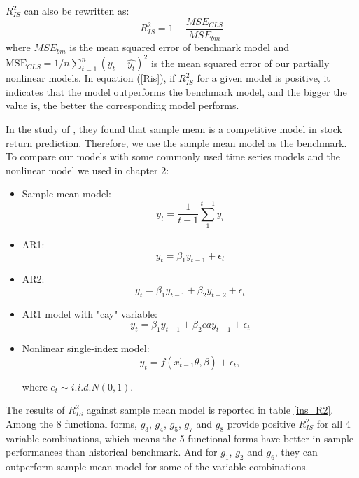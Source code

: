 \documentclass[a4paper,12pt,times,numbered,print,index]{report}
\numberwithin{equation}{section}
\begin{document}

$R^2_{IS}$ can also be rewritten as:
\begin{equation}
	R_{IS}^{2}=1-\frac{MSE_{CLS}}{MSE_{bm}}
	\label{Ris}
\end{equation}
where $MSE_{bm}$ is the mean squared error of benchmark model and $\mathrm{MSE}_{CLS}=1 / n \sum_{t=1}^{n}\left(y_{t}-\hat{y_t}\right)^{2}$ is the mean squared error of our partially nonlinear models.
In equation (\ref{Ris}), if $R^2_{IS}$ for a given model is positive, it indicates that the model outperforms the benchmark model, and the bigger the value is, the better the corresponding model performs.

In the study of \cite{welch2008comprehensive}, they found that sample mean is a competitive model in stock return prediction. Therefore, we use the sample mean model as the benchmark. To compare our models with some commonly used time series models and the nonlinear model we used in chapter 2:

\begin{itemize}
	\item Sample mean model: 
	$$
	y_t= \dfrac{1}{t-1}\sum_{1}^{t-1}y_i
	$$
	\item AR1:
	$$
	y_t = \beta_{1}y_{t-1} + \epsilon_t
	$$
	\item AR2:
	$$
	y_t =\beta_{1} y_{t-1} + \beta_{2} y_{t-2} + \epsilon_t
	$$
	\item AR1 model with "cay" variable:
	$$
	y_t = \beta_{1}y_{t-1} + \beta_{2}cay_{t-1} + \epsilon_t
	$$
	\item Nonlinear single-index model:
	$$
	y_{t} = f\left( x_{t-1}^{\prime }\theta,\beta\right) + \epsilon_{t},
	$$
	
	where $e_{t}\sim i.i.d.N\left( 0,1\right).$
\end{itemize}

The results of $R^2_{IS}$ against sample mean model is reported in table \ref{ins_R2}. Among the 8 functional forms, $g_3$, $g_4$, $g_5$, $g_7$ and $g_8$ provide positive $R^2_{IS}$ for all 4 variable combinations, which means the 5 functional forms have better in-sample performances than historical benchmark. And for $g_1$, $g_2$ and $g_6$, they can outperform sample mean model for some of the variable combinations. 


\end{document}
